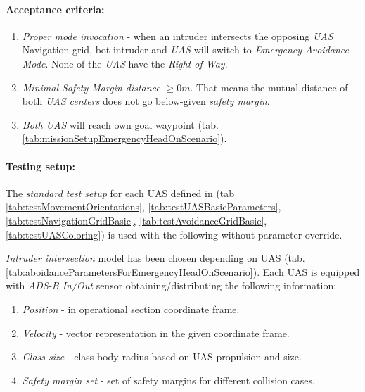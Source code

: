 \paragraph{Acceptance criteria:} 
\begin{enumerate}
    \item\emph{Proper mode invocation} - when an intruder intersects the opposing \emph{UAS} Navigation grid, bot intruder and \emph{UAS} will switch to \emph{Emergency Avoidance Mode}. None of the \emph{UAS} have the \emph{Right of Way}.
    
    \item\emph{Minimal Safety Margin distance} $\ge 0m$. That means the mutual distance of both \emph{UAS centers} does not go below-given \emph{safety margin}.
    
    \item\emph{Both UAS} will reach own goal waypoint (tab. \ref{tab:missionSetupEmergencyHeadOnScenario}).

\end{enumerate}

\paragraph{Testing setup:} The \emph{standard test setup} for each UAS defined in (tab \ref{tab:testMovementOrientations}, \ref{tab:testUASBasicParameters}, \ref{tab:testNavigationGridBasic}, \ref{tab:testAvoidanceGridBasic}, \ref{tab:testUASColoring}) is used with the following without parameter override.

\emph{Intruder intersection} model has been chosen depending on UAS (tab. \ref{tab:aboidanceParametersForEmergencyHeadOnScenario}). Each UAS is equipped with \emph{ADS-B In/Out} sensor obtaining/distributing the following information:

\begin{enumerate}
    \item \emph{Position} - in operational section coordinate frame.
    
    \item \emph{Velocity} - vector representation in the given coordinate frame.
    
    \item \emph{Class size} - class body radius based on UAS propulsion and size.
    
    \item \emph{Safety margin set} - set of safety margins for different collision cases.
\end{enumerate}


